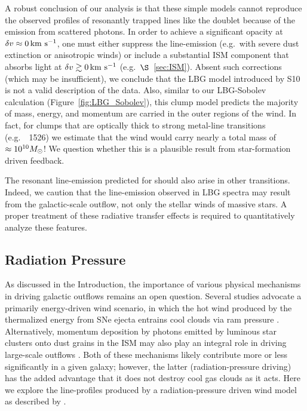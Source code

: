 \documentclass[12pt,preprint]{aastex}
\begin{document}
A robust conclusion of our
analysis is that these simple models cannot reproduce the
observed profiles of resonantly trapped lines like the 
doublet because of the emission from scattered photons.  In order to
achieve a significant opacity at $\delta v \approx 0 \, {\rm km~s^{-1}}$, one must
either suppress the line-emission (e.g.\ with severe dust extinction
or anisotropic winds) 
or include a substantial ISM component that absorbs light at $\delta v
\gtrsim 0 \, {\rm km~s^{-1}}$ (e.g.\ $\S$~\ref{sec:ISM}).  
Absent such corrections (which may be insufficient),
we conclude that the LBG model
introduced by S10 is not a valid description of the data.  Also,
similar to our LBG-Sobolev calculation (Figure~\ref{fig:LBG_Sobolev}),
this clump model predicts the majority of mass, energy, and momentum are
carried in the outer regions of the wind. 
In fact, for clumps that are optically thick to strong metal-line
transitions (e.g.\ ~1526) we estimate that the wind would
carry nearly a total mass of $\approx 10^{10} M_\odot$!  We question
whether this is a plausible result from star-formation driven
feedback.


The resonant line-emission predicted for  should also arise
in other transitions.  Indeed, we caution that the 
line-emission observed in LBG spectra
\citep[e.g.][]{prs+02} may result from the galactic-scale outflow, not
only the stellar winds of massive stars.
A proper treatment of these radiative transfer effects is required to
quantitatively analyze these features.

\subsection{Radiation Pressure}
\label{sec:radiative}

As discussed in the Introduction, the importance of various physical mechanisms
in driving galactic outflows remains an open
question.  Several studies advocate a primarily energy-driven
wind scenario, in which the hot wind produced by the thermalized
energy from SNe ejecta entrains cool clouds via ram pressure \citep[e.g.][]{cc85,ham90,sh09}.
Alternatively, momentum deposition by photons emitted by luminous star clusters onto
dust grains in the ISM may also play an integral role in driving
large-scale outflows \citep[e.g.][]{mqt05,mmt10}.  Both of these
mechanisms likely contribute more or less significantly in a given
galaxy; however, the latter (radiation-pressure driving) has the added
advantage that it does not destroy cool gas clouds as it acts.  Here
we explore the line-profiles produced by a radiation-pressure driven
wind model as described by \cite{mqt05}.
\end{document}
